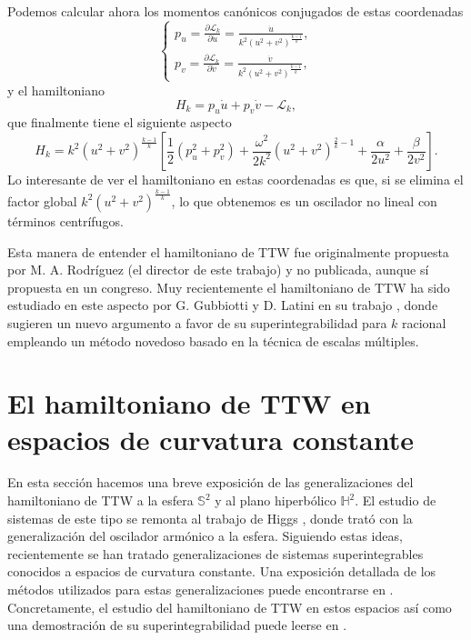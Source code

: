\documentclass[12pt,a4paper,twoside]{article}
\theoremstyle{definition} \newtheorem{defn}[thm]{Definición}
\theoremstyle{definition} \newtheorem{ejemplo}[thm]{Ejemplo}
\theoremstyle{definition} \newtheorem{ejercicio}[thm]{Ejercicio}
\theoremstyle{remark} \newtheorem*{obs}{Observación}
\begin{document}
Podemos calcular ahora los momentos canónicos conjugados de estas coordenadas
\begin{equation}
  \begin{cases}
    p_u=\frac{\partial \mathcal{L} _k}{\partial \dot{u}}=\frac{\dot{u}}{k^2 (u^2+v^2)^{\frac{k-1}{k}}}, \\
    p_v=\frac{\partial \mathcal{L} _k}{\partial \dot{v}}=\frac{\dot{v}}{k^2 (u^2+v^2)^{\frac{k-1}{k}}},
  \end{cases}
\end{equation}
y el hamiltoniano
\begin{equation*}
  H_k=p_u \dot{u} + p_v \dot{v} - \mathcal{L}_k,
\end{equation*}
que finalmente tiene el siguiente aspecto
\begin{equation}
  H_k = k^2 (u^2+v^2)^{\frac{k-1}{k}}\left[ \frac{1}{2}(p_u^2+p_v^2)+ \frac{\omega^2}{2k^2}(u^2+v^2)^{\frac{2}{k}-1}+\frac{\alpha}{2u^2}+\frac{\beta}{2 v^2} \right]. 
\end{equation}
Lo interesante de ver el hamiltoniano en estas coordenadas es que, si se elimina el factor global $k^2(u^2+v^2)^{\frac{k-1}{k}}$, lo que obtenemos es un oscilador no lineal con términos centrífugos.

Esta manera de entender el hamiltoniano de TTW fue originalmente propuesta por M. A. Rodríguez (el director de este trabajo) y no publicada, aunque sí propuesta en un congreso. Muy recientemente el hamiltoniano de TTW ha sido estudiado en este aspecto por G. Gubbiotti y D. Latini en su trabajo \cite{gubbiottilatini}, donde sugieren un nuevo argumento a favor de su superintegrabilidad para $k$ racional empleando un método novedoso basado en la técnica de escalas múltiples.

\section{El hamiltoniano de TTW en espacios de curvatura constante}
En esta sección hacemos una breve exposición de las generalizaciones del hamiltoniano de TTW a la esfera $\mathbb{S} ^2$ y al plano hiperbólico $\mathbb{H} ^2.$ El estudio de sistemas de este tipo se remonta al trabajo de Higgs \cite{higgs}, donde trató con la generalización del oscilador armónico a la esfera. Siguiendo estas ideas, recientemente se han tratado generalizaciones de sistemas superintegrables conocidos a espacios de curvatura constante. Una exposición detallada de los métodos utilizados para estas generalizaciones puede encontrarse en \cite{ballesteros}. Concretamente, el estudio del hamiltoniano de TTW en estos espacios así como una demostración de su superintegrabilidad puede leerse en \cite{ranada}.
\end{document}
